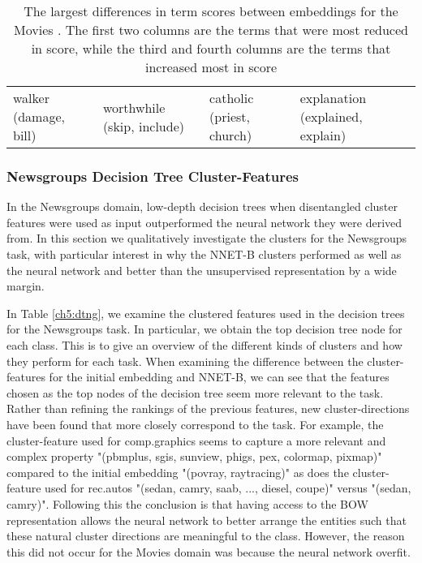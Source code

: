 \begin{landscape}
\begin{table}[]
\begin{tabular}{llll}
		walker (damage, bill)          & worthwhile (skip, include)         & catholic (priest, church)             & explanation (explained, explain)     \\
		\end{tabular}\caption{The largest differences in term scores between embeddings for the Movies . The first two columns are the terms that were most reduced in score, while the third and fourth columns are the terms that increased most in score}\label{ch5:diff}
\end{table}
\end{landscape}

\subsubsection{Newsgroups Decision Tree Cluster-Features}\label{ch5:newsgroupsquant}

In the Newsgroups domain, low-depth decision trees when disentangled cluster features were used as input outperformed the neural network they were derived from. In this section we qualitatively investigate the clusters for the Newsgroups task, with particular interest in why the NNET-B clusters performed as well as the neural network and better than the unsupervised representation by a wide margin.

In Table \ref{ch5:dtng}, we examine the clustered features used in the decision trees for the Newsgroups task. In particular, 
we obtain the top decision tree node for each class. This is to give an overview of the different kinds of clusters and how they perform for each task. When examining the difference between the cluster-features for the initial embedding and NNET-B, we can see that the features chosen as the top nodes of the decision tree seem more relevant to the task. Rather than refining the rankings of the previous features, new cluster-directions have been found that more closely correspond to the task. For example, the cluster-feature used for comp.graphics seems to capture a more relevant and complex property  "(pbmplus, sgis, sunview, phigs, pex, colormap, pixmap)" compared to the initial embedding "(povray, raytracing)" as does the cluster-feature used for rec.autos "(sedan, camry, saab, ..., diesel, coupe)" versus "(sedan, camry)". Following this the conclusion is that having access to the BOW representation allows the neural network to better arrange the entities such that these natural cluster directions are meaningful to the class. However, the reason this did not occur for the Movies domain was because the neural network overfit. 

